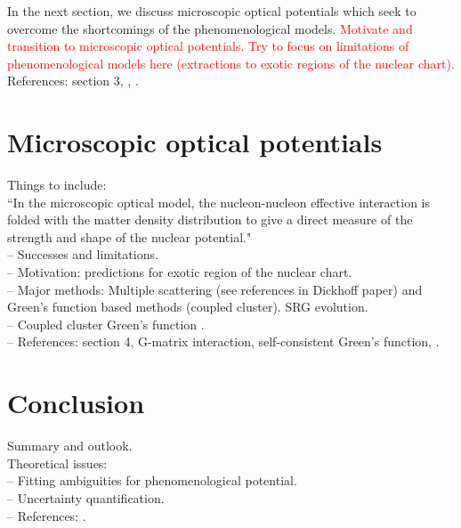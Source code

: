 \documentclass[preprintnumbers,floatfix,aps,prc,preprint,nofootinbib]{revtex4-1}
\begin{document}
In the next section, we discuss microscopic optical potentials which seek to overcome the shortcomings of the phenomenological models. \textcolor{red}{Motivate and transition to microscopic optical potentials. Try to focus on limitations of phenomenological models here (extractions to exotic regions of the nuclear chart).}
\\

References: \cite{Dickhoff:2018wdd} section 3, \cite{Perey:1976zz}, \cite{Koning:2003zz}.


\section{Microscopic optical potentials}
\label{sec:microscopic}


Things to include:
\\
``In the microscopic optical model, the nucleon-nucleon effective interaction is folded with the matter density distribution to give a direct measure of the strength and shape of the nuclear potential."
\\
-- Successes and limitations.
\\
-- Motivation: predictions for exotic region of the nuclear chart.
\\
-- Major methods: Multiple scattering (see references in Dickhoff paper) and Green's function based methods (coupled cluster). SRG evolution.
\\
-- Coupled cluster Green's function \cite{Rotureau:2016jpf}.
\\
-- References: \cite{Dickhoff:2018wdd} section 4, \cite{Furumoto:2019anr} G-matrix interaction, \cite{Idini:2019hkq} self-consistent Green's function, \cite{Rotureau:2016jpf}.


\section{Conclusion}
\label{sec:conclusion}


Summary and outlook.
\\
Theoretical issues:
\\
-- Fitting ambiguities for phenomenological potential.
\\
-- Uncertainty quantification.
\\
-- References: \cite{King:2018vzw}.





\end{document}
